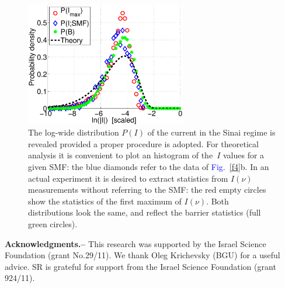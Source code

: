 \documentclass[aps,prl,floats,floatfix,twocolumn]{revtex4}
\newcommand{\Fig}[1]{\textcolor{blue}{Fig.}\!\!~\ref{#1}}
\begin{document}
\begin{figure}
\includegraphics[width=7cm]{PlnI.eps}

\caption{The log-wide distribution $P(I)$ of the current 
in the Sinai regime is revealed provided a proper procedure 
is adopted. For theoretical analysis it is convenient 
to plot an histogram of the~$I$ values for a given SMF:
the blue diamonds refer to the data of \Fig{f4}b.  
%
In an actual experiment it is desired to extract
statistics from $I(\nu)$ measurements without 
referring to the SMF: the red empty circles 
show the statistics of the first maximum of $I(\nu)$.    
%
Both distributions look the same, and reflect 
the barrier statistics (full green circles).}

\label{f5}
\end{figure}


\clearpage


{\bf Acknowledgments.-- }
%
This research was supported by the Israel Science Foundation (grant No.29/11).
We thank Oleg Krichevsky (BGU) for a useful advice. SR is grateful for support from
the Israel Science Foundation (grant 924/11).
\end{document}
